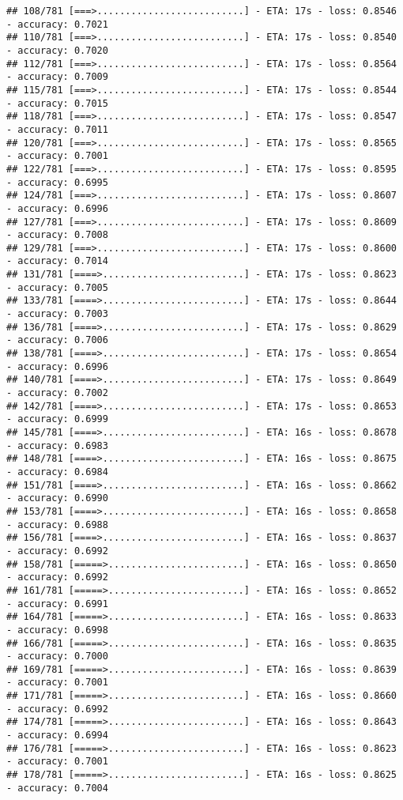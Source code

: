 \documentclass[
]{article}
\begin{document}
\begin{verbatim}
## 108/781 [===>..........................] - ETA: 17s - loss: 0.8546 - accuracy: 0.7021
## 110/781 [===>..........................] - ETA: 17s - loss: 0.8540 - accuracy: 0.7020
## 112/781 [===>..........................] - ETA: 17s - loss: 0.8564 - accuracy: 0.7009
## 115/781 [===>..........................] - ETA: 17s - loss: 0.8544 - accuracy: 0.7015
## 118/781 [===>..........................] - ETA: 17s - loss: 0.8547 - accuracy: 0.7011
## 120/781 [===>..........................] - ETA: 17s - loss: 0.8565 - accuracy: 0.7001
## 122/781 [===>..........................] - ETA: 17s - loss: 0.8595 - accuracy: 0.6995
## 124/781 [===>..........................] - ETA: 17s - loss: 0.8607 - accuracy: 0.6996
## 127/781 [===>..........................] - ETA: 17s - loss: 0.8609 - accuracy: 0.7008
## 129/781 [===>..........................] - ETA: 17s - loss: 0.8600 - accuracy: 0.7014
## 131/781 [====>.........................] - ETA: 17s - loss: 0.8623 - accuracy: 0.7005
## 133/781 [====>.........................] - ETA: 17s - loss: 0.8644 - accuracy: 0.7003
## 136/781 [====>.........................] - ETA: 17s - loss: 0.8629 - accuracy: 0.7006
## 138/781 [====>.........................] - ETA: 17s - loss: 0.8654 - accuracy: 0.6996
## 140/781 [====>.........................] - ETA: 17s - loss: 0.8649 - accuracy: 0.7002
## 142/781 [====>.........................] - ETA: 17s - loss: 0.8653 - accuracy: 0.6999
## 145/781 [====>.........................] - ETA: 16s - loss: 0.8678 - accuracy: 0.6983
## 148/781 [====>.........................] - ETA: 16s - loss: 0.8675 - accuracy: 0.6984
## 151/781 [====>.........................] - ETA: 16s - loss: 0.8662 - accuracy: 0.6990
## 153/781 [====>.........................] - ETA: 16s - loss: 0.8658 - accuracy: 0.6988
## 156/781 [====>.........................] - ETA: 16s - loss: 0.8637 - accuracy: 0.6992
## 158/781 [=====>........................] - ETA: 16s - loss: 0.8650 - accuracy: 0.6992
## 161/781 [=====>........................] - ETA: 16s - loss: 0.8652 - accuracy: 0.6991
## 164/781 [=====>........................] - ETA: 16s - loss: 0.8633 - accuracy: 0.6998
## 166/781 [=====>........................] - ETA: 16s - loss: 0.8635 - accuracy: 0.7000
## 169/781 [=====>........................] - ETA: 16s - loss: 0.8639 - accuracy: 0.7001
## 171/781 [=====>........................] - ETA: 16s - loss: 0.8660 - accuracy: 0.6992
## 174/781 [=====>........................] - ETA: 16s - loss: 0.8643 - accuracy: 0.6994
## 176/781 [=====>........................] - ETA: 16s - loss: 0.8623 - accuracy: 0.7001
## 178/781 [=====>........................] - ETA: 16s - loss: 0.8625 - accuracy: 0.7004

\end{verbatim}
\end{document}
